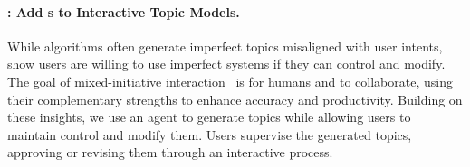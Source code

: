 %


\paragraph{\bass{}: Add \mm{}s to Interactive Topic Models.}

While algorithms often generate imperfect topics misaligned with user
intents, \citet{dietvorst2016overcoming} show users are willing to use
imperfect systems if they can control and modify.
%
The goal of mixed-initiative
interaction~\cite{horvitz1999mixed-initiative} is for humans and
 to collaborate, using their complementary strengths to
enhance accuracy and productivity.
%
Building on these insights, we use an \mm{} agent to generate topics
while allowing users to maintain control and modify them.
%
Users supervise the generated topics, approving or revising them
through an interactive process.
%
%

